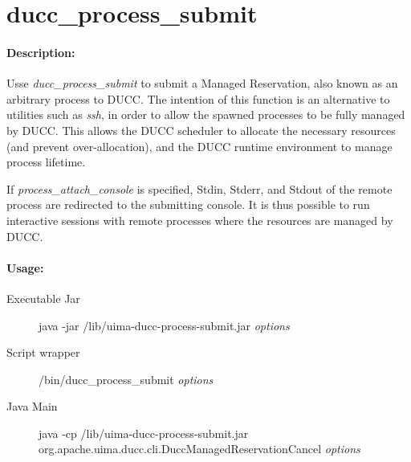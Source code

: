 \ifpdf
\else
{}
\fi
    \section{ducc\_process\_submit}

    \paragraph{Description:}
       Usse {\em ducc\_process\_submit} to submit a Managed Reservation, also known as an
       arbitrary process to DUCC.  The intention
       of this function is an alternative to utilities such as {\em ssh}, in order to allow the
       spawned processes to be fully managed by DUCC.  This allows the DUCC scheduler to allocate
       the necessary resources (and prevent over-allocation), and the DUCC runtime environment
       to manage process lifetime.

       If {\em process\_attach\_console} is specified, Stdin, Stderr, and Stdout of the remote
       process are redirected to the submitting console.  It is thus possible to run interactive
       sessions with remote processes where the resources are managed by DUCC.

    \paragraph{Usage:}
    \begin{description}
    \item[Executable Jar] java -jar \ducchome/lib/uima-ducc-process-submit.jar {\em options}
    \item[Script wrapper] \ducchome/bin/ducc\_process\_submit {\em options}
    \item[Java Main]      java -cp \ducchome/lib/uima-ducc-process-submit.jar org.apache.uima.ducc.cli.DuccManagedReservationCancel {\em options}
    \end{description}


